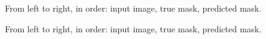 \documentclass[
	a4paper, %
	10pt, %
	unnumberedsections, %
	twoside, %
]{LTJournalArticle}
\begin{document}
\begin{figure}
    \centering
    \caption{From left to right, in order: input image, true mask, predicted mask.}
    \label{fig:foobar1}
\end{figure}
\begin{figure}
    \centering
    \caption{From left to right, in order: input image, true mask, predicted mask.}
    \label{fig:foobar2}
\end{figure}




\printbibliography %

\end{document}
